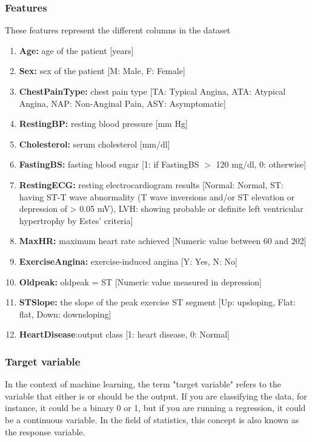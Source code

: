 \subsubsection{Features}
These features represent the different columns in the dataset
\begin{enumerate}[label=(\alph*)]
	\item{\textbf{Age:} age of the patient [years]}
	\item{\textbf{Sex:} sex of the patient [M: Male, F: Female]}
	\item{\textbf{ChestPainType:} chest pain type [TA: Typical Angina, ATA: Atypical Angina, NAP: Non-Anginal Pain, ASY: Asymptomatic]}
	\item{\textbf{RestingBP:} resting blood pressure [mm Hg]}
	\item{\textbf{Cholesterol:} serum cholesterol [mm/dl]}
	\item{\textbf{FastingBS:} fasting blood sugar [1: if FastingBS $>$ 120 mg/dl, 0: otherwise]}
	\item{\textbf{RestingECG:} resting electrocardiogram results [Normal: Normal, ST: having ST-T wave abnormality (T wave inversions and/or ST elevation or depression of > 0.05 mV), LVH: showing probable or definite left ventricular hypertrophy by Estes' criteria]}
	\item{\textbf{MaxHR:} maximum heart rate achieved [Numeric value between 60 and 202]}
	\item{\textbf{ExerciseAngina:} exercise-induced angina [Y: Yes, N: No]}
	\item{\textbf{Oldpeak:} oldpeak = ST [Numeric value measured in depression]}
	\item{\textbf{ST\textunderscore Slope:} the slope of the peak exercise ST segment [Up: upsloping, Flat: flat, Down: downsloping]}
	\item{\textbf{HeartDisease}:output class [1: heart disease, 0: Normal]}
\end{enumerate}

\subsubsection{Target variable}
In the context of machine learning, the term "target variable" refers to the variable that either is or should be the output. If you are classifying the data, for instance, it could be a binary 0 or 1, but if you are running a regression, it could be a continuous variable. In the field of statistics, this concept is also known as the response variable.

